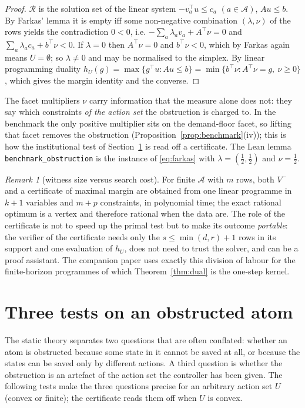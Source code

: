 \documentclass[11pt,a4paper]{article}
\theoremstyle{plain}
\theoremstyle{definition}
\theoremstyle{remark}
\newtheorem{remark}[theorem]{Remark}
\newcommand{\calA}{\mathcal{A}}
\newcommand{\calR}{\mathcal{R}}
\newcommand{\tfr}[2]{\tfrac{#1}{#2}}
\begin{document}
\begin{proof}
$\calR$ is the solution set of the linear system $-v_a^\top u\le c_a$ $(a\in\calA)$, $Au\le b$. By Farkas' lemma \cite{Farkas1902,Chvatal1983} it is empty iff some non-negative combination $(\lambda,\nu)$ of the rows yields the contradiction $0<0$, i.e. $-\sum_a\lambda_av_a+A^\top\nu=0$ and $\sum_a\lambda_ac_a+b^\top\nu<0$. If $\lambda=0$ then $A^\top\nu=0$ and $b^\top\nu<0$, which by Farkas again means $U=\emptyset$; so $\lambda\neq0$ and may be normalised to the simplex. By linear programming duality $h_U(g)=\max\{g^\top u: Au\le b\}=\min\{b^\top\nu: A^\top\nu=g,\ \nu\ge0\}$, which gives the margin identity and the converse.
\end{proof}

The facet multipliers $\nu$ carry information that the measure alone does not: they say which constraints \emph{of the action set} the obstruction is charged to. In the benchmark the only positive multiplier sits on the demand-floor facet, so lifting that facet removes the obstruction (Proposition~\ref{prop:benchmark}(iv)); this is how the institutional test of Section~\ref{sec:taxonomy} is read off a certificate. The Lean lemma \texttt{benchmark\_obstruction} is the instance of \eqref{eq:farkas} with $\lambda=(\tfr12,\tfr12)$ and $\nu=\tfr12$.

\begin{remark}[witness size versus search cost]\label{rem:search}
For finite $\calA$ with $m$ rows, both $V^-$ and a certificate of maximal margin are obtained from one linear programme in $k+1$ variables and $m+p$ constraints, in polynomial time; the exact rational optimum is a vertex and therefore rational when the data are. The role of the certificate is not to speed up the primal test but to make its outcome \emph{portable}: the verifier of the certificate needs only the $s\le\min(d,r)+1$ rows in its support and one evaluation of $h_U$, does not need to trust the solver, and can be a proof assistant. The companion paper \cite{Abaee2026cert} uses exactly this division of labour for the finite-horizon programmes of which Theorem~\ref{thm:dual} is the one-step kernel.
\end{remark}
\section{Three tests on an obstructed atom}\label{sec:taxonomy}

The static theory separates two questions that are often conflated: whether an atom is obstructed because some state in it cannot be saved at all, or because the states can be saved only by different actions. A third question is whether the obstruction is an artefact of the action set the controller has been given. The following tests make the three questions precise for an arbitrary action set $U$ (convex or finite); the certificate reads them off when $U$ is convex.
\end{document}
